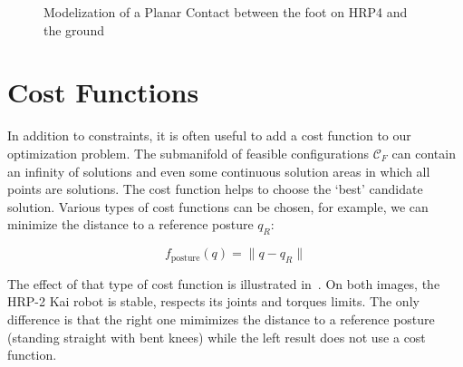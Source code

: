 \begin{figure}[htpb]
  \centering
  \setlength{\fboxsep}{0pt}%
  \setlength{\fboxrule}{1pt}%
  \caption{Modelization of a Planar Contact between the foot on HRP4 and the ground}
\label{fig:planarContact}
\end{figure}



\section{Cost Functions}
\label{sec:cost_functions}


In addition to constraints, it is often useful to add a cost function to our optimization problem.
The submanifold of feasible configurations $\mathcal{C}_F$ can contain an infinity of solutions and even some continuous solution areas in which all points are solutions.
The cost function helps to choose the `best' candidate solution.
Various types of cost functions can be chosen, for example, we can minimize the distance to a reference posture $q_R$:

\begin{equation*}
  f_\text{posture}(q) = \|q-q_R\|
\end{equation*}

The effect of that type of cost function is illustrated in~. On both images, the HRP-2 Kai robot is stable, respects its joints and torques limits. The only difference is that the right one mimimizes the distance to a reference posture (standing straight with bent knees) while the left result does not use a cost function.

